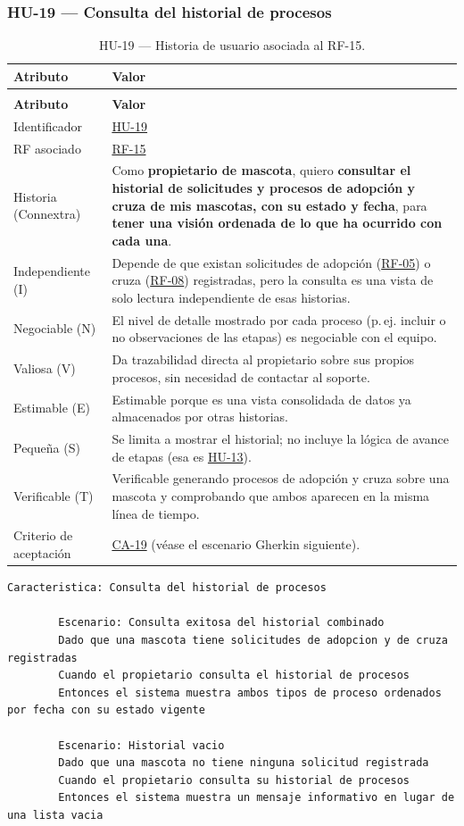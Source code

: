 \documentclass[journal,onecolumn]{IEEEtran}
\makeatletter
\newenvironment{atributos}[2]{%
	\small
	\begin{longtable}{@{}>{\raggedright\arraybackslash}p{4.2cm} >{\raggedright\arraybackslash}p{11.2cm}@{}}
		\caption{#2}\label{tab:#1}\\
		\toprule
		\textbf{Atributo} & \textbf{Valor} \\
		\midrule
		\endfirsthead
		\multicolumn{2}{@{}l}{\small\itshape (continuación)}\\
		\toprule
		\textbf{Atributo} & \textbf{Valor} \\
		\midrule
		\endhead
		\bottomrule
		\endlastfoot
	}{%
	\end{longtable}
	\normalsize
}
\makeatother
\begin{document}
	\subsubsection{HU-19 --- Consulta del historial de procesos}
	
	\begin{atributos}{HU-19}{HU-19 --- Historia de usuario asociada al RF-15.}
		Identificador & \hyperref[tab:HU-19]{HU-19} \\
		RF asociado & \hyperref[tab:RF-15]{RF-15} \\
		Historia (Connextra) & Como \textbf{propietario de mascota}, quiero \textbf{consultar el historial de solicitudes y procesos de adopción y cruza de mis mascotas, con su estado y fecha}, para \textbf{tener una visión ordenada de lo que ha ocurrido con cada una}. \\
		Independiente (I) & Depende de que existan solicitudes de adopción (\hyperref[tab:RF-05]{RF-05}) o cruza (\hyperref[tab:RF-08]{RF-08}) registradas, pero la consulta es una vista de solo lectura independiente de esas historias. \\
		Negociable (N) & El nivel de detalle mostrado por cada proceso (p.\,ej. incluir o no observaciones de las etapas) es negociable con el equipo. \\
		Valiosa (V) & Da trazabilidad directa al propietario sobre sus propios procesos, sin necesidad de contactar al soporte. \\
		Estimable (E) & Estimable porque es una vista consolidada de datos ya almacenados por otras historias. \\
		Pequeña (S) & Se limita a mostrar el historial; no incluye la lógica de avance de etapas (esa es \hyperref[tab:HU-13]{HU-13}). \\
		Verificable (T) & Verificable generando procesos de adopción y cruza sobre una mascota y comprobando que ambos aparecen en la misma línea de tiempo. \\
		Criterio de aceptación & \hyperref[lst:ca19]{CA-19} (véase el escenario Gherkin siguiente). \\
	\end{atributos}
	
	\begin{lstlisting}[style=gherkin,caption={CA-19 --- Escenario de aceptación de la historia HU-19.},label={lst:ca19}]
		Caracteristica: Consulta del historial de procesos
		
		Escenario: Consulta exitosa del historial combinado
		Dado que una mascota tiene solicitudes de adopcion y de cruza registradas
		Cuando el propietario consulta el historial de procesos
		Entonces el sistema muestra ambos tipos de proceso ordenados por fecha con su estado vigente
		
		Escenario: Historial vacio
		Dado que una mascota no tiene ninguna solicitud registrada
		Cuando el propietario consulta su historial de procesos
		Entonces el sistema muestra un mensaje informativo en lugar de una lista vacia
	\end{lstlisting}
	
\end{document}
